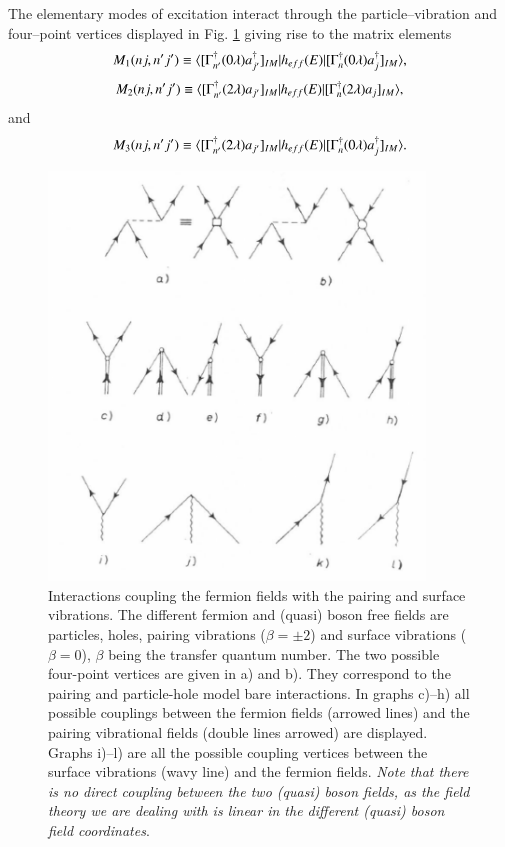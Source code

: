 The elementary modes of excitation interact through the particle--vibration and four--point vertices displayed in Fig. \ref{figC1A6} giving rise to the matrix elements 
  \begin{align}\label{eqC1A83} 
   M_1(nj,n'j')\equiv \langle {[\Gamma^\dagger_{n'}(0\lambda)a^\dagger_{j'}]_{IM}|h_{eff}(E)|[\Gamma^\dagger_n(0\lambda)a^\dagger_j]_{IM}} \rangle,
    \end{align}   
  \begin{align}\label{eqC1A84} 
   M_2(nj,n'j')\equiv \langle {[\Gamma^\dagger_{n'}(2\lambda)a_{j'}]_{IM}|h_{eff}(E)|[\Gamma^\dagger_n(2\lambda)a_j]_{IM}} \rangle,
    \end{align}    
and 
  \begin{align}\label{eqC1A85} 
   M_3(nj,n'j')\equiv \langle {[\Gamma^\dagger_{n'}(2\lambda)a_{j'}]_{IM}|h_{eff}(E)|[\Gamma^\dagger_{n}(0\lambda)a^\dagger_j]_{IM}} \rangle.
    \end{align}   
     \begin{figure}
     \centerline {
     \includegraphics*[width=10cm]{introduccion/figs/fig23}
     }
     \caption[Interactions coupling the fermion fields with the pairing and surface vibrations.]{Interactions coupling the fermion fields with the pairing and surface vibrations. The different fermion and (quasi) boson free fields are particles, holes, pairing vibrations ($\beta=\pm2$) and surface vibrations ($\beta=0$), $\beta$ being the transfer quantum number. The two possible four-point vertices are given in a) and b). They correspond to the pairing and particle-hole model bare interactions. In graphs c)--h) all possible couplings between the fermion fields (arrowed lines) and the pairing vibrational fields (double lines arrowed) are displayed. Graphs i)--l) are all the possible coupling vertices between the surface vibrations (wavy line) and the fermion fields. \textit{Note that there is no direct coupling between the two (quasi) boson fields, as the field theory we are dealing with is linear in the different (quasi) boson field coordinates}.}
     \label{figC1A6}
     \end{figure}

